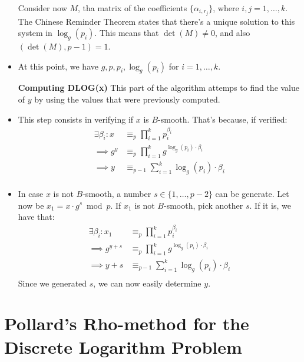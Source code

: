 \begin{itemize}
\begin{align*}
    \end{align*}
    Consider now $M$, tha matrix of the coefficients $\{\alpha_{i, r_{j}}\}$, where $i,j = 1, \dots, k$. The Chinese Reminder Theorem states that there's a unique solution to this system in $\operatorname{log}_{g}(p_{i})$. This means that $\operatorname{det}(M) \neq 0$, and also $(\operatorname{det}(M), p-1) = 1$.
    \item At this point, we have $g, p, p_{i}, \operatorname{log}_{g}(p_{i})$ for $i = 1, \dots, k$.
    \item[\textbf{Computing DLOG(x)}] This part of the algorithm attemps to find the value of $y$ by using the values that were previously computed.
    \item This step consists in verifying if $x$ is $B$-smooth. That's because, if verified:
    \begin{align*}
        \exists \beta_{i}: x &\equiv_{p} \prod_{i=1}^{k} p_{i}^{\beta_{i}}\\
        \implies g^{y} &\equiv_{p} \prod_{i=1}^{k} g^{\operatorname{log}_{g}(p_{i}) \cdot \beta_{i}}\\
        \implies y &\equiv_{p - 1} \sum_{i=1}^{k} \operatorname{log}_{g}(p_{i}) \cdot \beta_{i}\\
    \end{align*}
    \item In case $x$ is not $B$-smooth, a number $s \in \{1, \dots, p-2\}$ can be generate. Let now be $x_{1} = x \cdot g^{s} \bmod p$. If $x_{1}$ is not $B$-smooth, pick another $s$. If it is, we have that:
    \begin{align*}
        \exists \beta_{i}: x_{1} &\equiv_{p} \prod_{i=1}^{k} p_{i}^{\beta_{i}}\\
        \implies g^{y + s} &\equiv_{p} \prod_{i=1}^{k} g^{\operatorname{log}_{g}(p_{i}) \cdot \beta_{i}}\\
        \implies y + s &\equiv_{p - 1} \sum_{i=1}^{k} \operatorname{log}_{g}(p_{i}) \cdot \beta_{i}\\
    \end{align*}
    Since we generated $s$, we can now easily determine $y$.
\end{itemize}

\section{Pollard's Rho-method for the Discrete Logarithm Problem}
